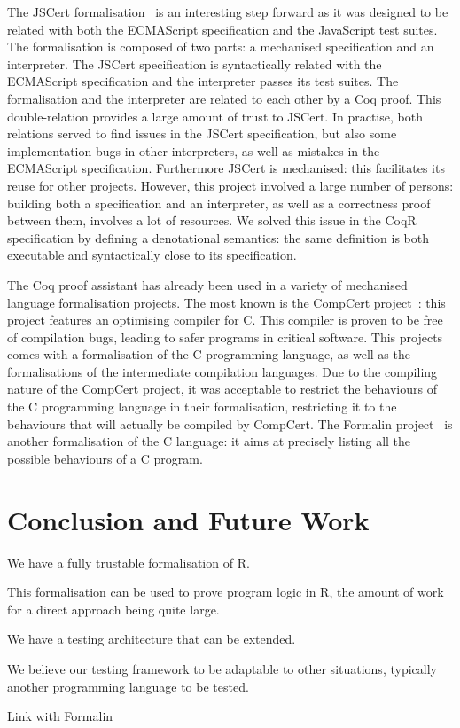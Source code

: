 \documentclass[
    sigplan,
    10pt,
    review, %
    natbib=false %
 ]{acmart}
\begin{document}
The JSCert formalisation~\parencite{jscert, popl14jscert}
is an interesting step forward as it was designed
to be related with both the ECMAScript specification and the JavaScript test suites.
The formalisation is composed of two parts:
a mechanised specification and an interpreter.
The JSCert specification is syntactically related with the ECMAScript specification
and the interpreter passes its test suites.
The formalisation and the interpreter are related to each other by a Coq proof.
This double-relation provides a large amount of trust to JSCert.
In practise, both relations served to find issues in the JSCert specification,
but also some implementation bugs in other interpreters,
as well as mistakes in the ECMAScript specification.
Furthermore JSCert is mechanised:
this facilitates its reuse for other projects.
However, this project involved a large number of persons:
building both a specification and an interpreter,
as well as a correctness proof between them, involves a lot of resources.
We solved this issue in the CoqR specification
by defining a denotational semantics:
the same definition is both executable and syntactically close to its specification.

The Coq proof assistant has already been used
in a variety of mechanised language formalisation projects.
The most known is the CompCert project~\cite{Leroy-Compcert-CACM}:
this project features an optimising compiler for C.
This compiler is proven to be free of compilation bugs,
leading to safer programs in critical software.
This projects comes with a formalisation of the C programming language,
as well as the formalisations of the intermediate compilation languages.
%
Due to the compiling nature of the CompCert project,
it was acceptable to restrict the behaviours of the C programming language
in their formalisation,
restricting it to the behaviours that will actually be compiled by CompCert.
The Formalin project~\parencite{formalin} is another formalisation
of the C language:
it aims at precisely listing all the possible behaviours of a C program.

\section{Conclusion and Future Work}
\label{sec:conclusion}

We have a fully trustable formalisation of R.

This formalisation can be used to prove program logic in R,
the amount of work for a direct approach being quite large.

We have a testing architecture that can be extended.

We believe our testing framework to be adaptable to other situations,
typically another programming language to be tested.

Link with Formalin

\printbibliography{}
\end{document}

